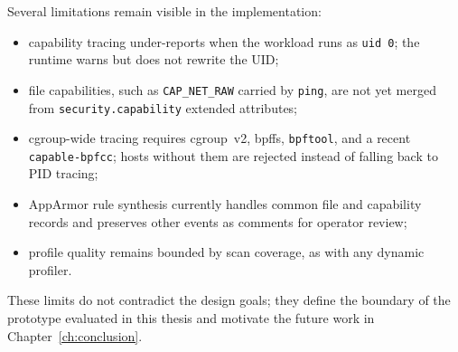 Several limitations remain visible in the implementation:

\begin{itemize}
    \item capability tracing under-reports when the workload runs as \texttt{uid 0}; the runtime warns but does not rewrite the UID;
    \item file capabilities, such as \texttt{CAP\_NET\_RAW} carried by \texttt{ping}, are not yet merged from \texttt{security.capability} extended attributes;
    \item cgroup-wide tracing requires cgroup~v2, bpffs, \texttt{bpftool}, and a recent \texttt{capable-bpfcc}; hosts without them are rejected instead of falling back to PID tracing;
    \item AppArmor rule synthesis currently handles common file and capability records and preserves other events as comments for operator review;
    \item profile quality remains bounded by scan coverage, as with any dynamic profiler.
\end{itemize}

These limits do not contradict the design goals; they define the boundary of the prototype evaluated in this thesis and motivate the future work in Chapter~\ref{ch:conclusion}.
